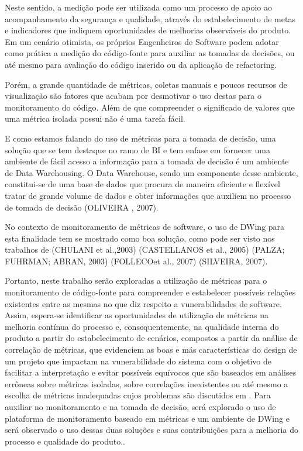 %

Neste sentido, a medição pode ser utilizada como um processo de apoio ao acompanhamento da segurança e qualidade, através do estabelecimento de metas e indicadores que indiquem oportunidades de melhorias observáveis do produto. Em um cenário otimista, os próprios Engenheiros de Software podem adotar como prática a medição do código-fonte para auxiliar as tomadas de decisões, ou até mesmo para avaliação do código inserido ou da aplicação de refactoring.


Porém, a grande quantidade de métricas, coletas manuais e poucos recursos de visualização são fatores que acabam por desmotivar o uso destas para o monitoramento do código. Além de que compreender o significado de valores que uma métrica isolada possui não é uma tarefa fácil.

E como estamos falando do uso de métricas para a tomada de decisão, uma solução que se tem destaque no ramo de BI e tem enfase em fornecer uma ambiente de fácil acesso a informação para a tomada de decisão é um ambiente de Data Warehousing. O Data Warehouse, sendo um componente desse ambiente, constitui-se de uma base de dados que procura de maneira eficiente e flexível tratar de grande volume de dados e obter informações que auxiliem no processo de tomada de decisão (OLIVEIRA , 2007).

No contexto de monitoramento de métricas de software, o uso de DWing para esta finalidade tem se mostrado como boa solução, como pode ser visto nos trabalhos de (CHULANI et al.,2003) (CASTELLANOS et al., 2005) (PALZA; FUHRMAN; ABRAN, 2003) (FOLLECOet al., 2007) (SILVEIRA, 2007). 


Portanto, neste trabalho serão exploradas a utilização de métricas para o monitoramento de código-fonte para compreender e estabelecer possíveis relações existentes entre as mesmas no que diz respeito a vunerabilidades de software. Assim, espera-se identificar as oportunidades de utilização de métricas na melhoria contínua do processo e, consequentemente, na qualidade interna do produto a partir do estabelecimento de cenários, compostos a partir da análise de correlação de métricas, que evidenciem as boas e más características do design de um projeto que impactam na vunerabilidade do sistema com o objetivo de facilitar a interpretação e evitar possíveis equívocos que são baseados em análises errôneas sobre métricas isoladas, sobre correlações inexistentes ou até mesmo a escolha de métricas inadequadas cujos problemas são discutidos em \cite{chidamber1994}. Para auxiliar no monitoramento e na tomada de decisão, será explorado o uso de plataforma de monitoramento baseado em métricas e um ambiente de DWing e será observado o uso dessas duas soluções e suas contribuições para a melhoria do processo e qualidade do produto..


